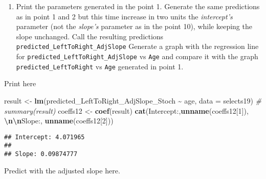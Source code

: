 \documentclass[
]{book}
\newenvironment{Shaded}{\begin{snugshade}}{\end{snugshade}}
\newcommand{\AttributeTok}[1]{\textcolor[rgb]{0.13,0.29,0.53}{#1}}
\newcommand{\CommentTok}[1]{\textcolor[rgb]{0.56,0.35,0.01}{\textit{#1}}}
\newcommand{\DecValTok}[1]{\textcolor[rgb]{0.00,0.00,0.81}{#1}}
\newcommand{\FunctionTok}[1]{\textcolor[rgb]{0.13,0.29,0.53}{\textbf{#1}}}
\newcommand{\NormalTok}[1]{#1}
\newcommand{\OtherTok}[1]{\textcolor[rgb]{0.56,0.35,0.01}{#1}}
\newcommand{\SpecialCharTok}[1]{\textcolor[rgb]{0.81,0.36,0.00}{\textbf{#1}}}
\newcommand{\StringTok}[1]{\textcolor[rgb]{0.31,0.60,0.02}{#1}}
\providecommand{\tightlist}{%
  \setlength{\itemsep}{0pt}\setlength{\parskip}{0pt}}
\begin{document}
\begin{enumerate}
\def\labelenumi{\arabic{enumi}.}
\setcounter{enumi}{13}
\tightlist
\item
  Print the parameters generated in the point 1. Generate the same predictions as in point 1 and 2 but this time increase in two units the \emph{intercept's} parameter (not the \emph{slope's} parameter as in the point 10), while keeping the slope unchanged. Call the resulting predictions \texttt{predicted\_LeftToRight\_AdjSlope} Generate a graph with the regression line for \texttt{predicted\_LeftToRight\_AdjSlope} vs \texttt{Age} and compare it with the graph \texttt{predicted\_LeftToRight} vs \texttt{Age} generated in point 1.
\end{enumerate}

Print here

\begin{Shaded}
\begin{Highlighting}[]
\NormalTok{result }\OtherTok{\textless{}{-}} \FunctionTok{lm}\NormalTok{(predicted\_LeftToRight\_AdjSlope\_Stoch }\SpecialCharTok{\textasciitilde{}}\NormalTok{ age, }\AttributeTok{data =}\NormalTok{ selects19)}
\CommentTok{\# summary(result)}
\NormalTok{coeffs12 }\OtherTok{\textless{}{-}} \FunctionTok{coef}\NormalTok{(result)}
\FunctionTok{cat}\NormalTok{(}\StringTok{\textquotesingle{}Intercept:\textquotesingle{}}\NormalTok{,}\FunctionTok{unname}\NormalTok{(coeffs12[}\DecValTok{1}\NormalTok{]), }\StringTok{\textquotesingle{}}\SpecialCharTok{\textbackslash{}n\textbackslash{}n}\StringTok{Slope:\textquotesingle{}}\NormalTok{, }\FunctionTok{unname}\NormalTok{(coeffs12[}\DecValTok{2}\NormalTok{]))}
\end{Highlighting}
\end{Shaded}

\begin{verbatim}
## Intercept: 4.071965 
## 
## Slope: 0.09874777
\end{verbatim}

Predict with the adjusted slope here.

\begin{Shaded}
\end{Shaded}
\end{document}
